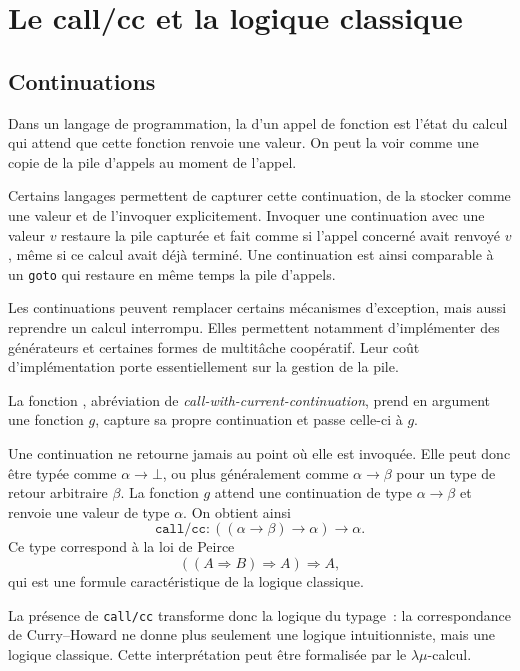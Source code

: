 \section{Le call/cc et la logique classique}

\subsection{Continuations}

\thingy Dans un langage de programmation, la  d'un
appel de fonction est l'état du calcul qui attend que cette fonction
renvoie une valeur. On peut la voir comme une copie de la pile d'appels
au moment de l'appel.

Certains langages permettent de capturer cette continuation, de la
stocker comme une valeur et de l'invoquer explicitement. Invoquer une
continuation avec une valeur $v$ restaure la pile capturée et fait
comme si l'appel concerné avait renvoyé $v$, même si ce calcul avait
déjà terminé. Une continuation est ainsi comparable à un
\texttt{goto} qui restaure en même temps la pile d'appels.

Les continuations peuvent remplacer certains mécanismes d'exception,
mais aussi reprendre un calcul interrompu. Elles permettent notamment
d'implémenter des générateurs et certaines formes de multitâche
coopératif. Leur coût d'implémentation porte essentiellement sur la
gestion de la pile.

\thingy La fonction , abréviation de
\textit{call-with-current-continuation}, prend en argument une fonction
$g$, capture sa propre continuation et passe celle-ci à $g$.

Une continuation ne retourne jamais au point où elle est invoquée.
Elle peut donc être typée comme $\alpha\to\bot$, ou plus généralement
comme $\alpha\to\beta$ pour un type de retour arbitraire $\beta$.
La fonction $g$ attend une continuation de type $\alpha\to\beta$ et
renvoie une valeur de type $\alpha$. On obtient ainsi
\[
\texttt{call/cc}:
((\alpha\to\beta)\to\alpha)\to\alpha.
\]
Ce type correspond à la loi de Peirce
\[
((A\Rightarrow B)\Rightarrow A)\Rightarrow A,
\]
qui est une formule caractéristique de la logique classique.

La présence de \texttt{call/cc} transforme donc la logique du typage :
la correspondance de Curry--Howard ne donne plus seulement une logique
intuitionniste, mais une logique classique. Cette interprétation peut
être formalisée par le $\lambda\mu$-calcul.

